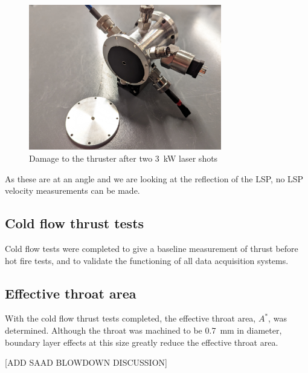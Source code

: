            \begin{figure}[!ht]
                \centering
                \includegraphics[width=0.75\textwidth]{assets/4 experiments/V2 test damage.jpg}
                \caption{Damage to the thruster after two \qty{3}{kW} laser shots}
            \end{figure}


            As these are at an angle and we are looking at the reflection of the LSP, no LSP velocity measurements can be made.
        
        \subsection{Cold flow thrust tests}

            Cold flow tests were completed to give a baseline measurement of thrust before hot fire tests, and to validate the functioning of all data acquisition systems.
            

            
        
        \subsection{Effective throat area}
            
            With the cold flow thrust tests completed, the effective throat area, $A^*$, was determined. Although the throat was machined to be \qty{0.7}{mm} in diameter, boundary layer effects at this size greatly reduce the effective throat area.

            [ADD SAAD BLOWDOWN DISCUSSION]


